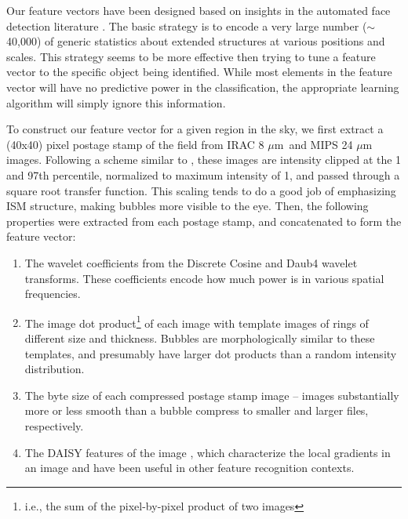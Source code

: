 \documentclass[preprint]{aastex}
\newcommand{\um}[0]{$\mu$m}
\begin{document}
Our feature vectors have been designed based on insights in the automated face detection literature \citep{ViolaJones}.  The basic strategy is to encode a very large number ($\sim$40,000) of generic statistics about extended structures at various positions and scales. This strategy seems to be more effective then trying to tune a feature vector to the specific object being identified. While most elements in the feature vector will have no predictive power in the classification, the appropriate learning algorithm will simply ignore this information.

To construct our feature vector for a given region in the sky, we first extract a (40x40) pixel postage stamp of the field from IRAC 8 \um\, and MIPS 24 \um\, images. Following a scheme similar to \cite{Simpson12}, these images are intensity clipped at the 1 and 97th percentile, normalized to maximum intensity of 1, and passed through a square root transfer function. This scaling tends to do a good job of emphasizing ISM structure, making bubbles more visible to the eye. Then, the following properties were extracted from each postage stamp, and concatenated to form the feature vector:

\begin{enumerate}
\item The wavelet coefficients from the Discrete Cosine and Daub4 wavelet transforms. These coefficients encode how much power is in various spatial frequencies.
\item The image dot product\footnote{i.e., the sum of the pixel-by-pixel product of two images} of each image with template images of rings of different size and thickness. Bubbles are morphologically similar to these templates, and presumably have larger dot products than a random intensity distribution.
\item The byte size of each compressed postage stamp image -- images substantially more or less smooth than a bubble compress to smaller and larger files, respectively.
\item The DAISY features of the image \citep{DAISY}, which characterize the local gradients in an image and have been useful in other feature recognition contexts.
\end{enumerate}
\end{document}
